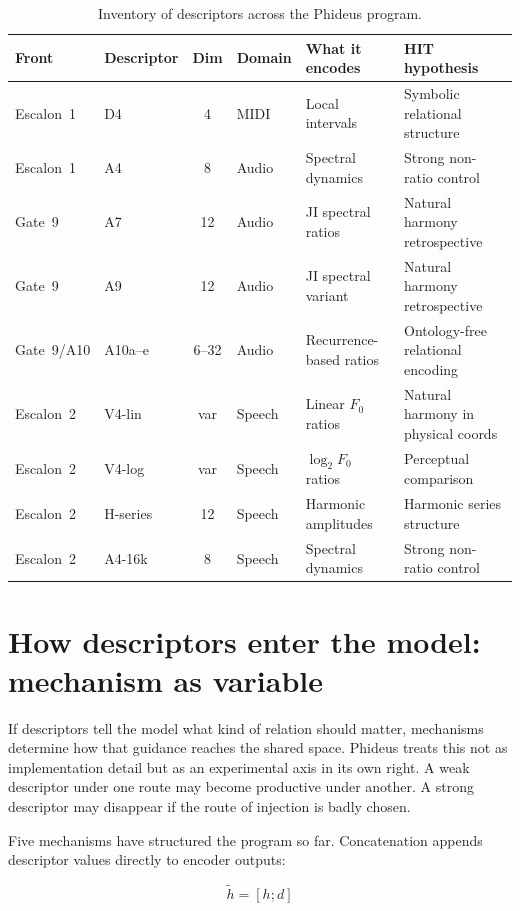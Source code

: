 \begin{table}[ht]
\centering
\caption{Inventory of descriptors across the Phideus program.}
\label{tab:descriptor_inventory}
\footnotesize
\begin{tabularx}{\textwidth}{@{}llclXX@{}}
\toprule
Front & Descriptor & Dim & Domain & What it encodes & HIT hypothesis \\
\midrule
Escalon~1 & D4 & 4 & MIDI & Local intervals & Symbolic relational structure \\
Escalon~1 & A4 & 8 & Audio & Spectral dynamics & Strong non-ratio control \\
Gate~9 & A7 & 12 & Audio & JI spectral ratios & Natural harmony retrospective \\
Gate~9 & A9 & 12 & Audio & JI spectral variant & Natural harmony retrospective \\
Gate~9/A10 & A10a--e & 6--32 & Audio & Recurrence-based ratios & Ontology-free relational encoding \\
\midrule
Escalon~2 & V4-lin & var & Speech & Linear $F_0$ ratios & Natural harmony in physical coords \\
Escalon~2 & V4-log & var & Speech & $\log_2 F_0$ ratios & Perceptual comparison \\
Escalon~2 & H-series & 12 & Speech & Harmonic amplitudes & Harmonic series structure \\
Escalon~2 & A4-16k & 8 & Speech & Spectral dynamics & Strong non-ratio control \\
\bottomrule
\end{tabularx}
\end{table}


\section{How descriptors enter the model: mechanism as variable}


If descriptors tell the model what kind of relation should matter, mechanisms determine how that guidance reaches the shared space. Phideus treats this not as implementation detail but as an experimental axis in its own right. A weak descriptor under one route may become productive under another. A strong descriptor may disappear if the route of injection is badly chosen.

Five mechanisms have structured the program so far. Concatenation appends descriptor values directly to encoder outputs:

$$
\tilde{h} = [h ; d]
$$

